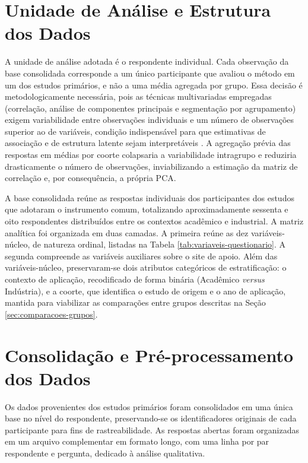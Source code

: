 \section{Unidade de Análise e Estrutura dos Dados}
\label{sec:unidade-analise}

A unidade de análise adotada é o respondente individual. Cada observação da base consolidada corresponde a um único participante que avaliou o método em um dos estudos primários, e não a uma média agregada por grupo. Essa decisão é metodologicamente necessária, pois as técnicas multivariadas empregadas (correlação, análise de componentes principais e segmentação por agrupamento) exigem variabilidade entre observações individuais e um número de observações superior ao de variáveis, condição indispensável para que estimativas de associação e de estrutura latente sejam interpretáveis \cite{hair2019}. A agregação prévia das respostas em médias por coorte colapsaria a variabilidade intragrupo e reduziria drasticamente o número de observações, inviabilizando a estimação da matriz de correlação e, por consequência, a própria PCA.

A base consolidada reúne as respostas individuais dos participantes dos estudos que adotaram o instrumento comum, totalizando aproximadamente sessenta e oito respondentes distribuídos entre os contextos acadêmico e industrial. A matriz analítica foi organizada em duas camadas. A primeira reúne as dez variáveis-núcleo, de natureza ordinal, listadas na Tabela \ref{tab:variaveis-questionario}. A segunda compreende as variáveis auxiliares sobre o site de apoio. Além das variáveis-núcleo, preservaram-se dois atributos categóricos de estratificação: o contexto de aplicação, recodificado de forma binária (Acadêmico \emph{versus} Indústria), e a coorte, que identifica o estudo de origem e o ano de aplicação, mantida para viabilizar as comparações entre grupos descritas na Seção \ref{sec:comparacoes-grupos}.

\section{Consolidação e Pré-processamento dos Dados}
\label{sec:consolidacao}

Os dados provenientes dos estudos primários foram consolidados em uma única base no nível do respondente, preservando-se os identificadores originais de cada participante para fins de rastreabilidade. As respostas abertas foram organizadas em um arquivo complementar em formato longo, com uma linha por par respondente e pergunta, dedicado à análise qualitativa.

